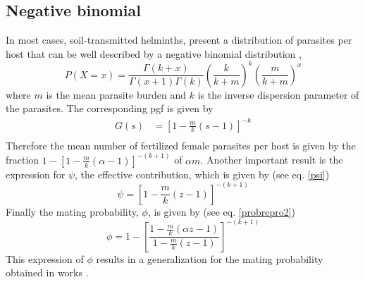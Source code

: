 \documentclass[useAMS,referee,usenatbib]{biom}
\begin{document}


\subsection{Negative binomial}
In most cases, soil-transmitted helminths, present a distribution of parasites per host that can be well described by a negative binomial distribution \cite{bundy1987epidemiology,hoagland1978necator,seo1979frequency},
\begin{equation}
P(X=x)=\frac{\Gamma(k+x)}{\Gamma(x+1)\Gamma(k)}\left( \frac{k}{k+m}\right) ^k \left( \frac{m}{k+m}\right) ^x
\end{equation}
where $m$ is the mean parasite burden and $k$ is the inverse dispersion parameter of the parasites. The corresponding pgf is given by
\begin{equation}
\begin{split}
G(s)&=\left[ 1-\frac{m}{k}(s-1)\right] ^{-k}\\
\end{split}
\end{equation}
Therefore the mean number of fertilized female parasites per host is given by the fraction
$ 1-\left[ 1-\frac{m}{k}(\alpha-1)\right] ^{-(k+1)} $  of $\alpha m$. 
Another important result is the expression for $\psi$, the effective contribution, which is given by (see eq. \eqref{psi})
\begin{equation}\label{phibn}
\psi=	 \left[ 1-\frac{m}{k}(z-1)\right] ^{-(k+1)} 
\end{equation}     
Finally the mating probability, $\phi$, is given by (see eq. \eqref{probrepro2})
\begin{equation} 
\phi=
1-\left[ \frac{ 1-\frac{m}{k}(\alpha z-1)}{1-\frac{m}{k}(z-1) }\right]  ^{-(k+1)} 
\end{equation}
This expression of $\phi$ results in a generalization for the mating probability obtained in works  \cite{anderson1992infectious,may1993biased,may1977togetherness}.
\end{document}
